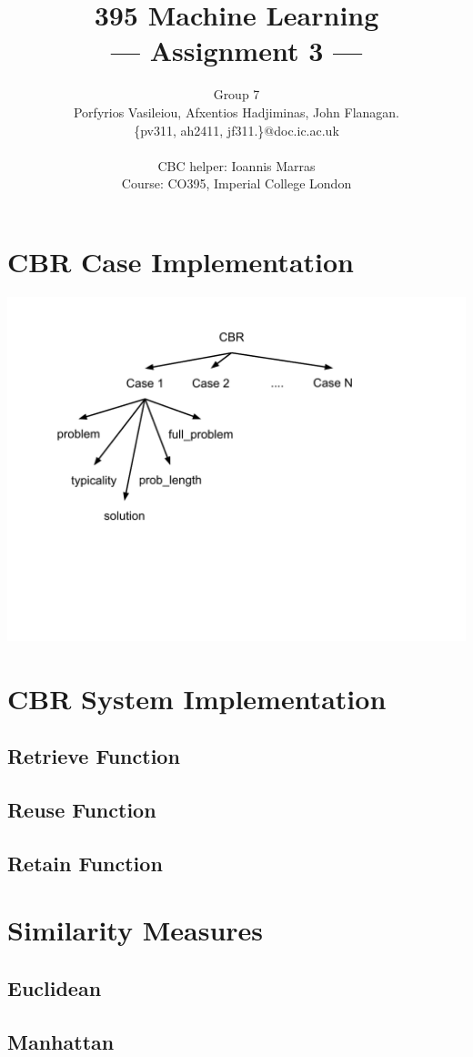 \documentclass[a4paper,11pt]{article}
\title{395 Machine Learning\\\Large{--- Assignment 3 ---}}
\author{Group 7\\Porfyrios Vasileiou, Afxentios Hadjiminas, John Flanagan.\\
       \{pv311, ah2411, jf311.\}@doc.ic.ac.uk\\ \\
       \small{CBC helper: Ioannis Marras}\\
       \small{Course: CO395, Imperial College London}
}
\begin{document}
\maketitle

\section{CBR Case Implementation}

\includegraphics[width=.5\textwidth]{structure.pdf}

\section{CBR System Implementation}

\subsection{Retrieve Function}

\subsection{Reuse  Function}

\subsection{Retain  Function}

\section{Similarity Measures}

\subsection{Euclidean}

\subsection{Manhattan}
\end{document}
